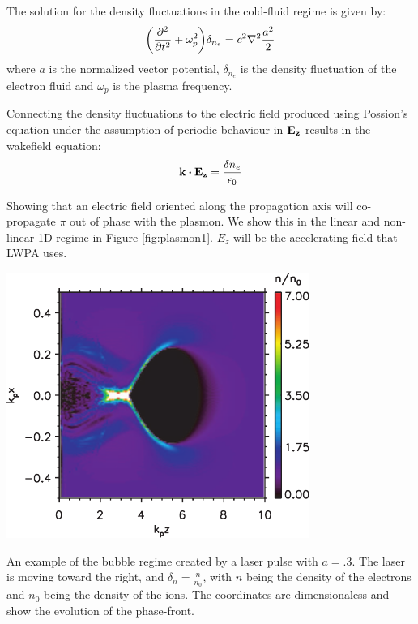 \documentclass[12pt,letter]{article}
\begin{document}
The solution for the density fluctuations in the cold-fluid
regime is given by\cite{RevModPhys.81.1229}:
\begin{equation}
    \label{eq:wave}
    \qty( \pdv[2]{t} + \omega_p^2 )\delta_{n_e} = c^2 \laplacian \frac{a^2}{2}
\end{equation}
where $a$ is the normalized vector potential, $\delta_{n_e}$ is the density
fluctuation
of the electron fluid and $\omega_p$ is the plasma frequency.

Connecting the density fluctuations to
the electric field produced using Possion's equation under the assumption
of periodic behaviour in $\vb{E_z}$ results in the wakefield equation:
\begin{equation}
    \vb{k}\dotproduct\vb{E_z} = \frac{\delta n_e}{\epsilon_0}
\end{equation}

Showing that an electric field oriented along the propagation axis will
co-propagate $\pi$ out of phase
with the plasmon. We show this in the linear
and non-linear 1D regime in Figure \ref{fig:plasmon1}. $E_z$ will be the accelerating field that LWPA uses.

\begin{marginfigure}[0pt]
    \includegraphics[width=\marginparwidth]{../figures/esblowout.pdf}
    \caption{\label{fig:bubble} An example of the bubble regime created by a laser pulse with $a =
    .3$. The laser is moving toward the right, and $\delta_n =\frac{n}{n_0}$,
with $n$ being the density of the electrons and $n_0$ being the density of the
ions. The coordinates are dimensionaless and show the evolution of the
phase-front.\cite{RevModPhys.81.1229}}
\end{marginfigure}
\end{document}
